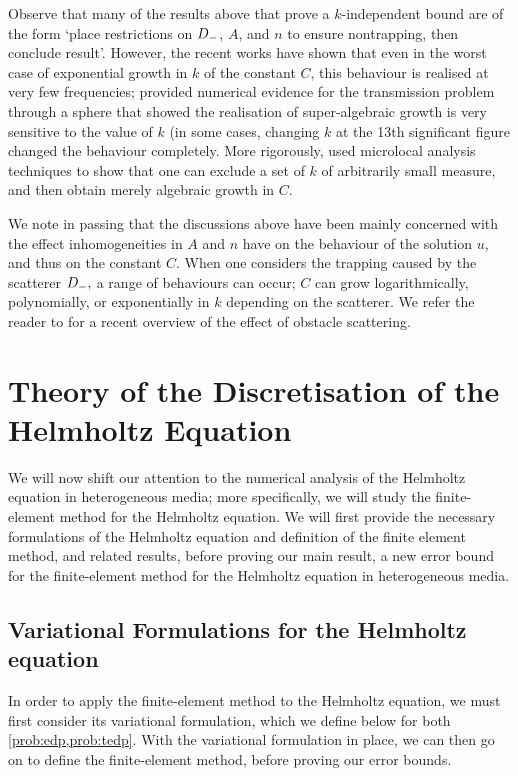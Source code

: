 Observe that many of the results above that prove a $k$-independent bound are of the form `place restrictions on $D_{-}$, $A$, and $n$ to ensure nontrapping, then conclude result'. However, the recent works \cite{MoSp:19,LaSpWu:19} have shown that even in the worst case of exponential growth in $k$ of the constant $C$, this behaviour is realised at very few frequencies; \cite{MoSp:19} provided numerical evidence for the transmission problem through a sphere that showed the realisation of super-algebraic growth is very sensitive to the value of $k$ (in some cases, changing $k$ at the 13th significant figure changed the behaviour completely. More rigorously, \cite{LaSpWu:19} used microlocal analysis techniques to show that one can exclude a set of $k$ of arbitrarily small measure, and then obtain merely algebraic growth in $C$.

We note in passing that the discussions above have been mainly concerned with the effect inhomogeneities in $A$ and $n$ have on the behaviour of the solution $u$, and thus on the constant $C$. When one considers the trapping caused by the scatterer $D_{-},$ a range of behaviours can occur; $C$ can grow logarithmically, polynomially, or exponentially in $k$ depending on the scatterer. We refer the reader to \cite[Sections 1.1 and 1.3]{ChGiSpSm:17} for a recent overview of the effect of obstacle scattering.
   




\section{Theory of the Discretisation of the Helmholtz Equation}\label{sec:helmfe}

We will now shift our attention to the numerical analysis of the Helmholtz equation in heterogeneous media; more specifically, we will study the finite-element method for the Helmholtz equation. We will first provide the necessary formulations of the Helmholtz equation and definition of the finite element method, and related results, before proving our main result, a new error bound for the finite-element method for the Helmholtz equation in heterogeneous media.

  \subsection{Variational Formulations for the Helmholtz equation}\label{sec:varform}

In order to apply the finite-element method to the Helmholtz equation, we must first consider its variational formulation, which we define below for both \cref{prob:edp,prob:tedp}. With the variational formulation in place, we can then go on to define the finite-element method, before proving our error bounds.
  
